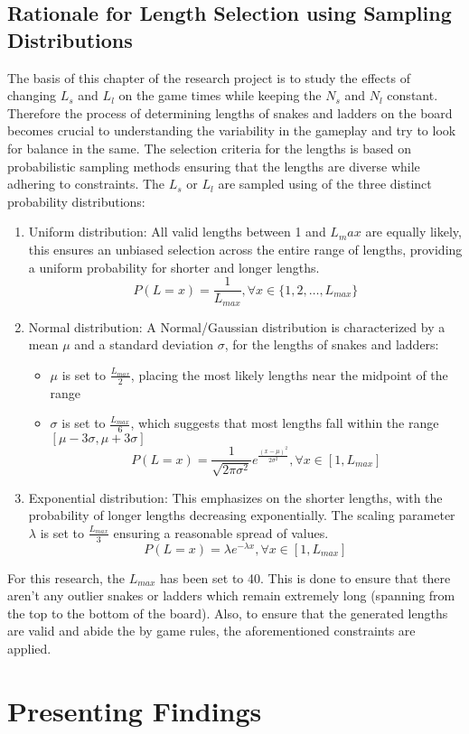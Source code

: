 \documentclass[12pt]{report}
\begin{document}
	\subsection{Rationale for Length Selection using Sampling Distributions}
	The basis of this chapter of the research project is to study the effects of changing $L_s$ and $L_l$ on the game times while keeping the $N_s$ and $N_l$ constant. Therefore the process of determining lengths of snakes and ladders on the board becomes crucial to understanding the variability in the gameplay and try to look for balance in the same. The selection criteria for the lengths is based on probabilistic sampling methods ensuring that the lengths are diverse while adhering to constraints. The $L_s$ or $L_l$ are sampled using of the three distinct probability distributions:
	\begin{enumerate}
		\item Uniform distribution: All valid lengths between 1 and $L_max$ are equally likely, this ensures an unbiased selection across the entire range of lengths, providing a uniform probability for shorter and longer lengths.
		$$P(L=x)=\frac{1}{L_{max}}, \forall x \in \{1,2,\ldots,L_{max}\}$$
		\item Normal distribution: A Normal/Gaussian distribution is characterized by a mean $\mu$ and a standard deviation $\sigma$, for the lengths of snakes and ladders:
		\begin{itemize}
			\item $\mu$ is set to $\frac{L_{max}}{2}$, placing the most likely lengths near the midpoint of the range
			\item $\sigma$ is set to $\frac{L_{max}}{6}$, which suggests that most lengths fall within the range $[\mu-3\sigma, \mu+3\sigma]$
			$$P(L=x) = \frac{1}{\sqrt{2\pi\sigma^2}}{e^{\frac{(x-\mu)^2}{2\sigma^2}}, \forall x\in[1, L_{max}]}$$
		\end{itemize}
		\item Exponential distribution: This emphasizes on the shorter lengths, with the probability of longer lengths decreasing exponentially. The scaling parameter $\lambda$ is set to $\frac{L_{max}}{3}$ ensuring a reasonable spread of values.
		$$P(L=x)={\lambda}e^{{-\lambda}x}, \forall x \in [1, L_{max}]$$
	\end{enumerate}
	
	For this research, the $L_{max}$ has been set to 40. This is done to ensure that there aren't any outlier snakes or ladders which remain extremely long (spanning from the top to the bottom of the board). Also, to ensure that the generated lengths are valid and abide the by game rules, the aforementioned constraints are applied.
	
	\section{Presenting Findings}
	
\end{document}

